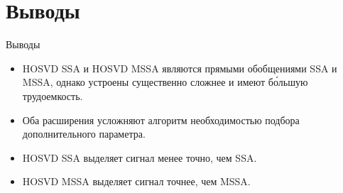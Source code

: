 \documentclass[ucs, notheorems, handout]{beamer}
\begin{document}
    \section{Выводы}\label{sec:conclusion}
    \begin{frame}{Выводы}
        \begin{itemize}
            \item HOSVD SSA и HOSVD MSSA являются прямыми обобщениями SSA и MSSA, однако устроены
            существенно сложнее и имеют б\'{о}льшую трудоемкость.
            \vspace{0.2cm}
            \item Оба расширения усложняют алгоритм необходимостью подбора дополнительного параметра.
            \vspace{0.2cm}
            \item HOSVD SSA выделяет сигнал менее точно, чем SSA\@.
            \vspace{0.2cm}
            \item HOSVD MSSA выделяет сигнал точнее, чем MSSA\@.
        \end{itemize}
    \end{frame}
\end{document}
